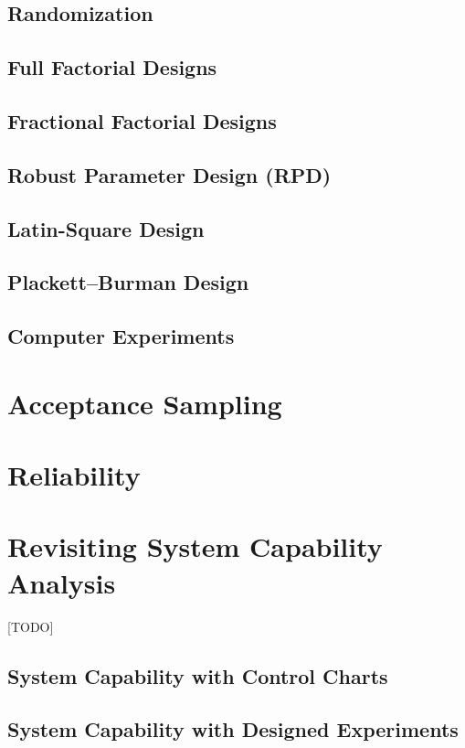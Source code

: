 \documentclass[12pt,a4paper]{report}
\begin{document}
\section{Randomization}

\section{Full Factorial Designs}
\section{Fractional Factorial Designs}
\section{Robust Parameter Design (RPD)}
\section{Latin-Square Design}
\section{Plackett–Burman Design}
\section{Computer Experiments}



\chapter{Acceptance Sampling}




\chapter{Reliability}




\chapter{Revisiting System Capability Analysis}
\label{sec:advanced_capability_analysis}
[TODO]
\section{System Capability with Control Charts}
\section{System Capability with Designed Experiments}




\newpage

\appendix







\newpage
{}


%
\label{sec:bibliography}
\end{document}
